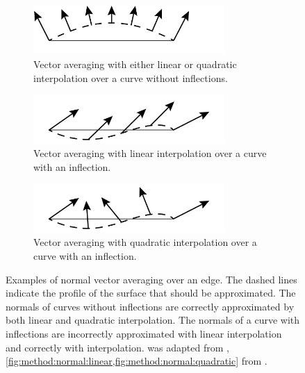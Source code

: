 	\begin{figure}
		\centering
		\begin{subfigure}{\columnwidth}
			\centering
			\includegraphics[width=0.8\textwidth]{./content/img/method/linearVsQuadraticNormals_both.png}
			\caption{Vector averaging with either linear or quadratic interpolation over a curve without inflections.}
			\label{fig:method:normal:both}
		\end{subfigure}
		\begin{subfigure}{\columnwidth}
			\centering
			\includegraphics[width=0.8\textwidth]{./content/img/method/linearVsQuadraticNormals_linear}
			\caption{Vector averaging with linear interpolation over a curve with an inflection.}
			\label{fig:method:normal:linear}
		\end{subfigure}	
		\begin{subfigure}{\columnwidth}
			\centering
			\includegraphics[width=0.8\textwidth]{./content/img/method/linearVsQuadraticNormals_quadratic}
			\caption{Vector averaging with quadratic interpolation over a curve with an inflection.}
			\label{fig:method:normal:quadratic}
		\end{subfigure}			
		\caption{Examples of normal vector averaging over an edge. The dashed lines indicate the profile of the surface that should be approximated.  The normals of curves without inflections are correctly approximated by both linear and quadratic interpolation. The normals of a curve with inflections are incorrectly approximated with  linear interpolation and correctly with  interpolation. 
		 was adapted from \textcite{van1997phong}, \cref{fig:method:normal:linear,fig:method:normal:quadratic} from \textcite{vlachos2001curved}.}
		\label{fig:method:linear_vs_quadratically_varying}
	\end{figure}	

